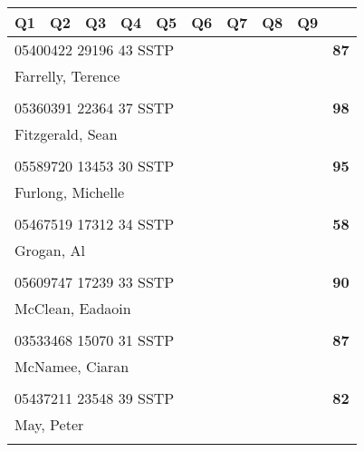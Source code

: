 \documentclass[a4paper,12pt]{article}
\begin{document}
\begin{tabular}{
   |p{9mm}|
    p{9mm}|
    p{9mm}|
    p{9mm}|
    p{9mm}|
    p{9mm}|
    p{9mm}|
    p{9mm}|
    p{9mm}|
    p{9mm}|}
\hline\hline
Q1 & Q2 & Q3 & Q4 & Q5 & Q6 & Q7 & Q8 & Q9 &     \\
\hline\hline
\multicolumn{9}{|l|}{05400422 29196 43 SSTP} & \textbf{87} \\
\hline
\multicolumn{10}{|l|}{Farrelly, Terence} \\
\hline
   \vrule height8mm width0pt depth2mm 
      &    &    &    &    &    &    &    &    &     \\
\hline\hline
\multicolumn{9}{|l|}{05360391 22364 37 SSTP} & \textbf{98} \\
\hline
\multicolumn{10}{|l|}{Fitzgerald, Sean} \\
\hline
   \vrule height8mm width0pt depth2mm 
      &    &    &    &    &    &    &    &    &     \\
\hline\hline
\multicolumn{9}{|l|}{05589720 13453 30 SSTP} & \textbf{95} \\
\hline
\multicolumn{10}{|l|}{Furlong, Michelle} \\
\hline
   \vrule height8mm width0pt depth2mm 
      &    &    &    &    &    &    &    &    &     \\
\hline\hline
\multicolumn{9}{|l|}{05467519 17312 34 SSTP} & \textbf{58} \\
\hline
\multicolumn{10}{|l|}{Grogan, Al} \\
\hline
   \vrule height8mm width0pt depth2mm 
      &    &    &    &    &    &    &    &    &     \\
\hline\hline
\multicolumn{9}{|l|}{05609747 17239 33 SSTP} & \textbf{90} \\
\hline
\multicolumn{10}{|l|}{McClean, Eadaoin} \\
\hline
   \vrule height8mm width0pt depth2mm 
      &    &    &    &    &    &    &    &    &     \\
\hline\hline
\multicolumn{9}{|l|}{03533468 15070 31 SSTP} & \textbf{87} \\
\hline
\multicolumn{10}{|l|}{McNamee, Ciaran} \\
\hline
   \vrule height8mm width0pt depth2mm 
      &    &    &    &    &    &    &    &    &     \\
\hline\hline
\multicolumn{9}{|l|}{05437211 23548 39 SSTP} & \textbf{82} \\
\hline
\multicolumn{10}{|l|}{May, Peter} \\
\hline
   \vrule height8mm width0pt depth2mm 
      &    &    &    &    &    &    &    &    &     \\

\end{tabular}
\end{document}

